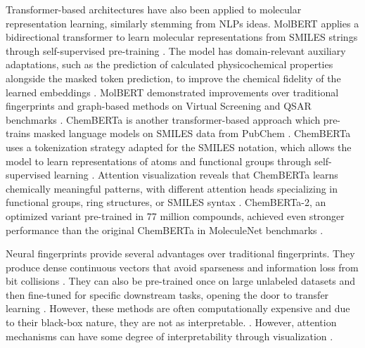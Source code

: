Transformer-based architectures have also been applied to molecular representation learning, similarly stemming from NLPs ideas. MolBERT applies a bidirectional transformer to learn molecular representations from SMILES strings through self-supervised pre-training \citep{Fabian2020}. The model has domain-relevant auxiliary adaptations, such as the prediction of calculated physicochemical properties alongside the masked token prediction, to improve the chemical fidelity of the learned embeddings \citep{Fabian2020}. MolBERT demonstrated improvements over traditional fingerprints and graph-based methods on Virtual Screening and QSAR benchmarks \citep{Fabian2020}. ChemBERTa is another transformer-based approach which pre-trains masked language models on SMILES data from PubChem \citep{Chithrananda2020}.  ChemBERTa uses a tokenization strategy adapted for the SMILES notation, which allows the model to learn representations of atoms and functional groups through self-supervised learning \citep{Chithrananda2020}. Attention visualization reveals that ChemBERTa learns chemically meaningful patterns, with different attention heads specializing in functional groups, ring structures, or SMILES syntax \citep{Chithrananda2020}. ChemBERTa-2, an optimized variant pre-trained in 77 million compounds, achieved even stronger performance than the original ChemBERTa in MoleculeNet benchmarks \citep{Ahmad2022}.

Neural fingerprints provide several advantages over traditional fingerprints. They produce dense continuous vectors that avoid sparseness and information loss from bit collisions \citep{Jaeger2018}. They can also be pre-trained once on large unlabeled datasets and then fine-tuned for specific downstream tasks, opening the door to transfer learning \citep{Chithrananda2020, Fabian2020}. However, these methods are often computationally expensive \citep{Jaeger2018} and due to their black-box nature, they are not as interpretable.  \citep{Chithrananda2020}. However, attention mechanisms can have some degree of interpretability through visualization \citep{Chithrananda2020}.

